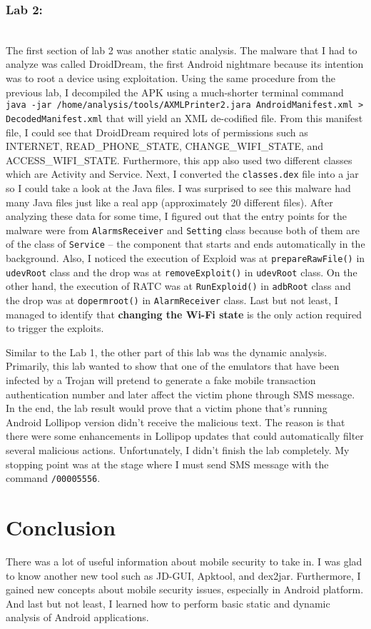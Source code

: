 \documentclass[letterpaper,10pt,titlepage,draftclsnofoot,onecolumn]{IEEEtran}
\begin{document}
\subsubsection{Lab 2:}
\hfill\\
The first section of lab 2 was another static analysis.
The malware that I had to analyze was called DroidDream, the first Android nightmare because its intention was to root a device using exploitation.
Using the same procedure from the previous lab, I decompiled the APK using a much-shorter terminal command \verb|java -jar /home/analysis/tools/AXMLPrinter2.jara AndroidManifest.xml > DecodedManifest.xml| that will yield an XML de-codified file.
From this manifest file, I could see that DroidDream required lots of permissions such as INTERNET, READ\_PHONE\_STATE, CHANGE\_WIFI\_STATE, and ACCESS\_WIFI\_STATE.
Furthermore, this app also used two different classes which are Activity and Service.
Next, I converted the \verb|classes.dex| file into a jar so I could take a look at the Java files.
I was surprised to see this malware had many Java files just like a real app (approximately 20 different files).
After analyzing these data for some time, I figured out that the entry points for the malware were from \verb|AlarmsReceiver| and \verb|Setting| class because both of them are of the class of \verb|Service| -- the component that starts and ends automatically in the background.
Also, I noticed the execution of Exploid was at \verb|prepareRawFile()| in \verb|udevRoot| class and the drop was at \verb|removeExploit()| in \verb|udevRoot| class. 
On the other hand, the execution of RATC was at \verb|RunExploid()| in \verb|adbRoot| class and the drop was at \verb|dopermroot()| in \verb|AlarmReceiver| class.
Last but not least, I managed to identify that \textbf{changing the Wi-Fi state} is the only action required to trigger the exploits.

Similar to the Lab 1, the other part of this lab was the dynamic analysis.
Primarily, this lab wanted to show that one of the emulators that have been infected by a Trojan will pretend to generate a fake mobile transaction authentication number and later affect the victim phone through SMS message. 
In the end, the lab result would prove that a victim phone that's running Android Lollipop version didn't receive the malicious text. 
The reason is that there were some enhancements in Lollipop updates that could automatically filter several malicious actions.
Unfortunately, I didn't finish the lab completely.
My stopping point was at the stage where I must send SMS message with the command \verb|/00005556|.

\section{Conclusion}
There was a lot of useful information about mobile security to take in.
I was glad to know another new tool such as JD-GUI, Apktool, and dex2jar.
Furthermore, I gained new concepts about mobile security issues, especially in Android platform.
And last but not least, I learned how to perform basic static and dynamic analysis of Android applications.
\end{document}
